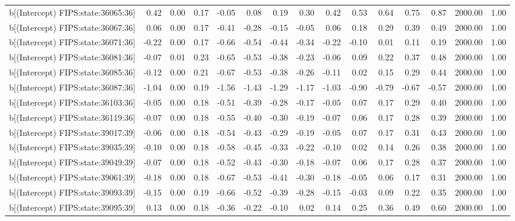 \begin{table}[ht]
\begin{tabular}{rrrrrrrrrrrrrrr}
  b[(Intercept) FIPS:state:36065:36] & 0.42 & 0.00 & 0.17 & -0.05 & 0.08 & 0.19 & 0.30 & 0.42 & 0.53 & 0.64 & 0.75 & 0.87 & 2000.00 & 1.00 \\ 
  b[(Intercept) FIPS:state:36067:36] & 0.06 & 0.00 & 0.17 & -0.41 & -0.28 & -0.15 & -0.05 & 0.06 & 0.18 & 0.29 & 0.39 & 0.49 & 2000.00 & 1.00 \\ 
  b[(Intercept) FIPS:state:36071:36] & -0.22 & 0.00 & 0.17 & -0.66 & -0.54 & -0.44 & -0.34 & -0.22 & -0.10 & 0.01 & 0.11 & 0.19 & 2000.00 & 1.00 \\ 
  b[(Intercept) FIPS:state:36081:36] & -0.07 & 0.01 & 0.23 & -0.65 & -0.53 & -0.38 & -0.23 & -0.06 & 0.09 & 0.22 & 0.37 & 0.48 & 2000.00 & 1.00 \\ 
  b[(Intercept) FIPS:state:36085:36] & -0.12 & 0.00 & 0.21 & -0.67 & -0.53 & -0.38 & -0.26 & -0.11 & 0.02 & 0.15 & 0.29 & 0.44 & 2000.00 & 1.00 \\ 
  b[(Intercept) FIPS:state:36087:36] & -1.04 & 0.00 & 0.19 & -1.56 & -1.43 & -1.29 & -1.17 & -1.03 & -0.90 & -0.79 & -0.67 & -0.57 & 2000.00 & 1.00 \\ 
  b[(Intercept) FIPS:state:36103:36] & -0.05 & 0.00 & 0.18 & -0.51 & -0.39 & -0.28 & -0.17 & -0.05 & 0.07 & 0.17 & 0.29 & 0.40 & 2000.00 & 1.00 \\ 
  b[(Intercept) FIPS:state:36119:36] & -0.07 & 0.00 & 0.18 & -0.55 & -0.40 & -0.30 & -0.19 & -0.07 & 0.06 & 0.17 & 0.28 & 0.39 & 2000.00 & 1.00 \\ 
  b[(Intercept) FIPS:state:39017:39] & -0.06 & 0.00 & 0.18 & -0.54 & -0.43 & -0.29 & -0.19 & -0.05 & 0.07 & 0.17 & 0.31 & 0.43 & 2000.00 & 1.00 \\ 
  b[(Intercept) FIPS:state:39035:39] & -0.10 & 0.00 & 0.18 & -0.58 & -0.45 & -0.33 & -0.22 & -0.10 & 0.02 & 0.14 & 0.26 & 0.38 & 2000.00 & 1.00 \\ 
  b[(Intercept) FIPS:state:39049:39] & -0.07 & 0.00 & 0.18 & -0.52 & -0.43 & -0.30 & -0.18 & -0.07 & 0.06 & 0.17 & 0.28 & 0.37 & 2000.00 & 1.00 \\ 
  b[(Intercept) FIPS:state:39061:39] & -0.18 & 0.00 & 0.18 & -0.67 & -0.53 & -0.41 & -0.30 & -0.18 & -0.05 & 0.06 & 0.17 & 0.31 & 2000.00 & 1.00 \\ 
  b[(Intercept) FIPS:state:39093:39] & -0.15 & 0.00 & 0.19 & -0.66 & -0.52 & -0.39 & -0.28 & -0.15 & -0.03 & 0.09 & 0.22 & 0.35 & 2000.00 & 1.00 \\ 
  b[(Intercept) FIPS:state:39095:39] & 0.13 & 0.00 & 0.18 & -0.36 & -0.22 & -0.10 & 0.02 & 0.14 & 0.25 & 0.36 & 0.49 & 0.60 & 2000.00 & 1.00 \\ 

\end{tabular}
\end{table}

